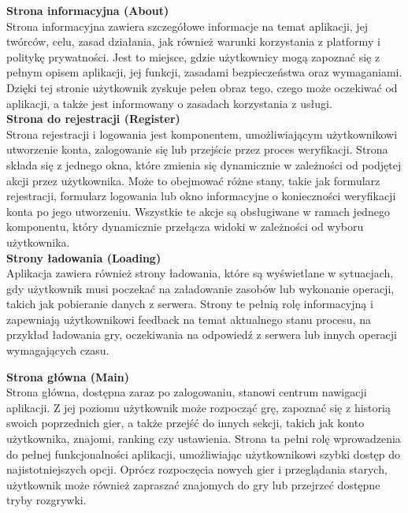 \documentclass[twoside]{projektInzynierskiMS1}
\begin{document}
\noindent \textbf{Strona informacyjna (About)}\\
Strona informacyjna zawiera szczegółowe informacje na temat aplikacji, jej twórców, celu, zasad działania, jak również warunki korzystania z platformy i politykę prywatności. Jest to miejsce, gdzie użytkownicy mogą zapoznać się z pełnym opisem aplikacji, jej funkcji, zasadami bezpieczeństwa oraz wymaganiami. Dzięki tej stronie użytkownik zyskuje pełen obraz tego, czego może oczekiwać od aplikacji, a także jest informowany o zasadach korzystania z usługi.
\\

\noindent \textbf{Strona do rejestracji (Register)}\\
Strona rejestracji i logowania jest komponentem, umożliwiającym użytkownikowi utworzenie konta, zalogowanie się lub przejście przez proces weryfikacji. Strona składa się z jednego okna, które zmienia się dynamicznie w zależności od podjętej akcji przez użytkownika. Może to obejmować różne stany, takie jak formularz rejestracji, formularz logowania lub okno informacyjne o konieczności weryfikacji konta po jego utworzeniu. Wszystkie te akcje są obsługiwane w ramach jednego komponentu, który dynamicznie przełącza widoki w zależności od wyboru użytkownika.
\\

\noindent \textbf{Strony ładowania (Loading)}\\
Aplikacja zawiera również strony ładowania, które są wyświetlane w sytuacjach, gdy użytkownik musi poczekać na załadowanie zasobów lub wykonanie operacji, takich jak pobieranie danych z serwera. Strony te pełnią rolę informacyjną i zapewniają użytkownikowi feedback na temat aktualnego stanu procesu, na przykład ładowania gry, oczekiwania na odpowiedź z serwera lub innych operacji wymagających czasu.

\newpage

\noindent \textbf{Strona główna (Main)}\\
Strona główna, dostępna zaraz po zalogowaniu, stanowi centrum nawigacji aplikacji. Z jej poziomu użytkownik może rozpocząć grę, zapoznać się z historią swoich poprzednich gier, a także przejść do innych sekcji, takich jak konto użytkownika, znajomi, ranking czy ustawienia. Strona ta pełni rolę wprowadzenia do pełnej funkcjonalności aplikacji, umożliwiając użytkownikowi szybki dostęp do najistotniejszych opcji. Oprócz rozpoczęcia nowych gier i przeglądania starych, użytkownik może również zapraszać znajomych do gry lub przejrzeć dostępne tryby rozgrywki.
\\
\end{document}
